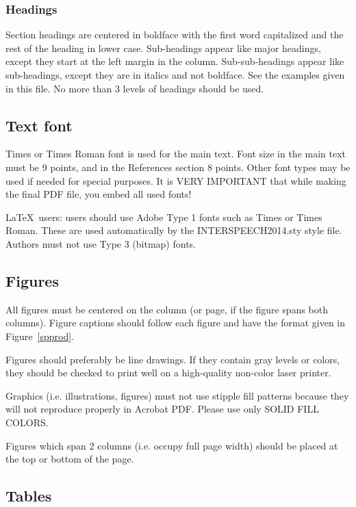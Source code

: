 \documentclass[a4paper]{article}
\begin{document}
\subsubsection{Headings}

Section headings are centered in boldface
with the first word capitalized and the rest of the heading in
lower case. Sub-headings appear like major headings, except they
start at the left margin in the column.
Sub-sub-headings appear like sub-headings, except they are in italics
and not boldface. See the examples given in this
file. No more than 3 levels of headings should be used.

\subsection{Text font}

Times or Times Roman font is used for the main text. Font size in the main text
must be 9 points, and in the References section 8 points. Other font
types may be used if needed for special purposes. It is VERY IMPORTANT
that while making the final PDF file, you embed all used fonts!

\LaTeX\ users: users should use Adobe Type 1 fonts such as Times or
Times Roman. These are used automatically by the INTERSPEECH2014.sty
style file. Authors must not use Type 3 (bitmap) fonts.

\subsection{Figures}

All figures must be centered on the column (or page, if the figure spans
both columns).
Figure captions should follow each figure and have the format given in
Figure~\ref{spprod}.

Figures should preferably be line drawings. If they contain gray
levels or colors, they should be checked to print well on a
high-quality non-color laser printer.

Graphics (i.e. illustrations, figures) must not use stipple fill
patterns because they will not reproduce properly in Acrobat PDF.
Please use only SOLID FILL COLORS.

Figures which span 2 columns (i.e. occupy full page width) should be
placed at the top or bottom of the page.



\subsection{Tables}
\end{document}
